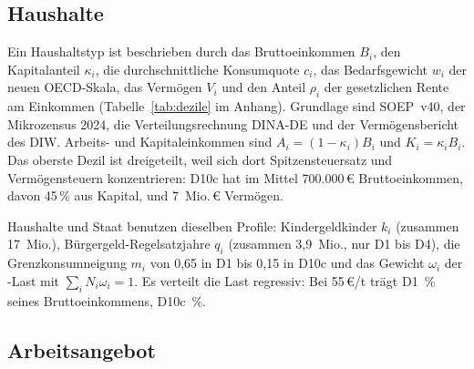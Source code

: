 \subsection{Haushalte}
\label{sec:haushalte}

Ein Haushaltstyp ist beschrieben durch das Bruttoeinkommen $B_i$, den
Kapitalanteil $\kappa_i$, die durchschnittliche Konsumquote $c_i$, das
Bedarfsgewicht $w_i$ der neuen OECD-Skala, das Vermögen $V_i$ und den Anteil
$\rho_i$ der gesetzlichen Rente am Einkommen (Tabelle~\ref{tab:dezile} im
Anhang). Grundlage sind SOEP~v40, der Mikrozensus 2024, die
Verteilungsrechnung DINA-DE und der Vermögensbericht des DIW. Arbeits- und
Kapitaleinkommen sind $A_i = (1-\kappa_i)B_i$ und $K_i = \kappa_i B_i$. Das
oberste Dezil ist dreigeteilt, weil sich dort Spitzensteuersatz und
Vermögensteuern konzentrieren: D10c hat im Mittel 700.000\,\euro{}
Bruttoeinkommen, davon 45\,\% aus Kapital, und 7~Mio.\,\euro{} Vermögen.

Haushalte und Staat benutzen dieselben Profile: Kindergeldkinder $k_i$
(zusammen 17~Mio.), Bürgergeld-Regelsatzjahre $q_i$ (zusammen 3,9~Mio., nur
D1 bis D4), die Grenzkonsumneigung $m_i$ von 0,65 in D1 bis 0,15 in D10c
\parencite{jappelli2014,fagereng2021} und das Gewicht $\omega_i$ der
\COz-Last mit $\sum_i N_i\omega_i = 1$. Es verteilt die Last regressiv: Bei
55\,\euro/t trägt D1 \LastDeins\,\% seines Bruttoeinkommens, D10c \LastDzehnc\,\%.

\subsection{Arbeitsangebot}
\label{sec:arbeit}

